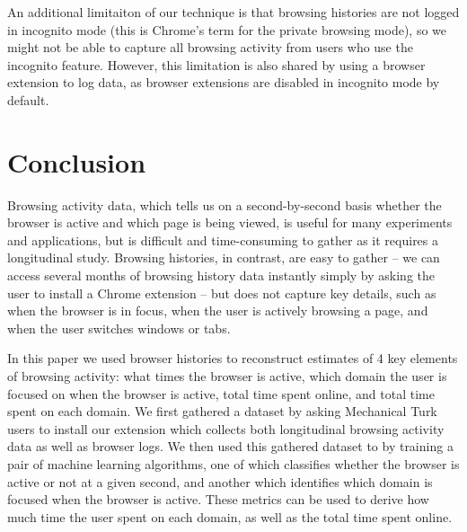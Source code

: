 \documentclass{sigchi}
\begin{document}
An additional limitaiton of our technique is that browsing histories are not logged in incognito mode (this is Chrome's term for the private browsing mode), so we might not be able to capture all browsing activity from users who use the incognito feature. However, this limitation is also shared by using a browser extension to log data, as browser extensions are disabled in incognito mode by default.




\section{Conclusion}

Browsing activity data, which tells us on a second-by-second basis whether the browser is active and which page is being viewed, is useful for many experiments and applications, but is difficult and time-consuming to gather as it requires a longitudinal study. Browsing histories, in contrast, are easy to gather -- we can access several months of browsing history data instantly simply by asking the user to install a Chrome extension -- but does not capture key details, such as when the browser is in focus, when the user is actively browsing a page, and when the user switches windows or tabs. 

In this paper we used browser histories to reconstruct estimates of 4 key elements of browsing activity: what times the browser is active, which domain the user is focused on when the browser is active, total time spent online, and total time spent on each domain. We first gathered a dataset by asking Mechanical Turk users to install our extension which collects both longitudinal browsing activity data as well as browser logs. We then used this gathered dataset to by training a pair of machine learning algorithms, one of which classifies whether the browser is active or not at a given second, and another which identifies which domain is focused when the browser is active. These metrics can be used to derive how much time the user spent on each domain, as well as the total time spent online.
\end{document}
